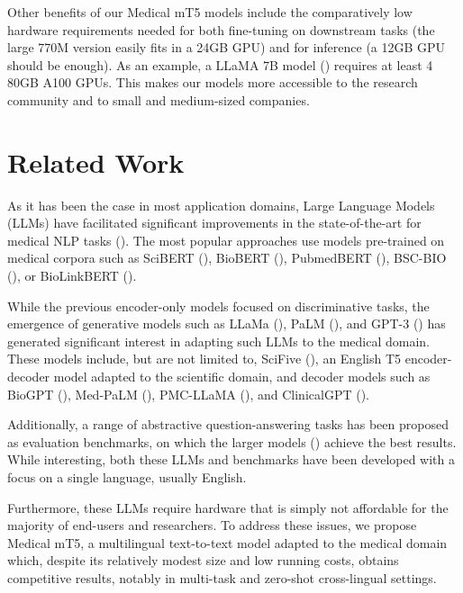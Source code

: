 Other benefits of our Medical mT5 models include the comparatively low hardware requirements needed for both fine-tuning on downstream tasks (the large 770M version easily fits in a 24GB GPU) and for inference (a 12GB GPU should be enough). As an example, a LLaMA 7B model (\cite{wu2023pmcllama}) requires at least 4 80GB A100 GPUs. This makes our models more accessible to the research community and to small and medium-sized companies.

\section{Related Work}



As it has been the case in most application domains, Large Language Models (LLMs) have facilitated significant improvements in the state-of-the-art for medical NLP tasks (\cite{singhal-palm,wu2023pmcllama,mayer2021enhancing}). The most popular approaches use models pre-trained on medical corpora such as SciBERT (\cite{beltagy2019scibert}), BioBERT (\cite{DBLP:journals/bioinformatics/LeeYKKKSK20}), PubmedBERT (\cite{DBLP:journals/health/GuTCLULNGP22}), BSC-BIO (\cite{carrino-etal-2022-pretrained}), or BioLinkBERT (\cite{DBLP:conf/acl/YasunagaLL22}).

While the previous encoder-only models focused on discriminative tasks, the emergence of generative models such as LLaMa (\cite{touvron2023llama}), PaLM (\cite{singhal-palm}), and GPT-3 (\cite{brown2020language}) has generated significant interest in adapting such LLMs to the medical domain. These models include, but are not limited to, SciFive (\cite{DBLP:journals/corr/abs-2106-03598}), an English T5 encoder-decoder model adapted to the scientific domain, and decoder models such as BioGPT (\cite{10.1093/bib/bbac409}), Med-PaLM (\cite{singhal-palm}), PMC-LLaMA (\cite{wu2023pmcllama}), and ClinicalGPT (\cite{Wang2023ClinicalGPTLL}). 

Additionally, a range of abstractive question-answering tasks has been proposed as evaluation benchmarks, on which the larger models (\cite{wu2023pmcllama,singhal-palm,Wang2023ClinicalGPTLL}) achieve the best results. While interesting, both these LLMs and benchmarks have been developed with a focus on a single language, usually English. 

Furthermore, these LLMs require hardware that is simply not affordable for the majority of end-users and researchers. To address these issues, we propose Medical mT5, a multilingual text-to-text model adapted to the medical domain which, despite its relatively modest size and low running costs, obtains competitive results, notably in multi-task and zero-shot cross-lingual settings.



